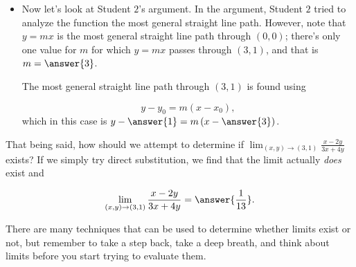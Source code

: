 \documentclass{ximera}
\begin{document}
\begin{exercise}
\begin{exercise}
\begin{itemize}
\item Now let's look at Student $2$'s argument.  In the argument, Student $2$ tried to analyze the function the most general straight line path.  However, note that $y=mx$ is the most general straight line path through $(0,0)$; there's only one value for $m$ for which $y=mx$ passes through $(3,1)$, and that is $m= \answer{3}$.

The most general straight line path through $(3,1)$ is found using 

\[
y-y_0 = m(x-x_0),
\] 
which in this case is $y-\answer{1} = m\left(x-\answer{3}\right)$.
\end{itemize}

That being said, how should we attempt to determine if $\lim_{(x,y) \to (3,1)} \frac{x-2y}{3x+4y}$ exists? If we simply try direct substitution, we find that the limit actually \emph{does} exist and

\[
\lim_{(x,y) \to (3,1)} \frac{x-2y}{3x+4y} = \answer{\frac{1}{13}}.
\]

\begin{feedback}[correct]
There are many techniques that can be used to determine whether limits exist or not, but remember to take a step back, take a deep breath, and think about limits before you start trying to evaluate them.

\end{feedback}
 

\end{exercise}

 \end{exercise}
\end{document}

